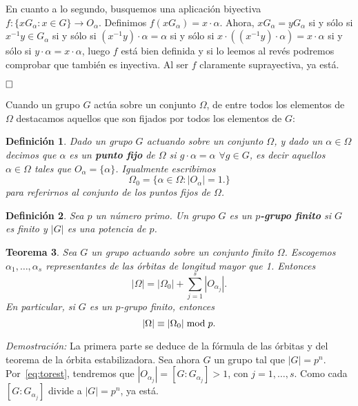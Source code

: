 \documentclass[12pt]{article}
\newtheorem{theorem}{Teorema}[section]
\newtheorem{definition}[theorem]{Definición}
\begin{document}
En cuanto a lo segundo, busquemos una aplicación biyectiva $f \colon \lbrace xG_\alpha : x \in G \rbrace \longrightarrow O_\alpha$. Definimos $f(xG_\alpha) = x\cdot \alpha$. Ahora, $xG_\alpha = y G_\alpha$ si y sólo si $x^{-1}y \in G_\alpha$ si y sólo si $(x^{-1}y) \cdot \alpha = \alpha$ si y sólo si $x \cdot ((x^{-1}y) \cdot \alpha) = x \cdot \alpha$ si y sólo si $y \cdot \alpha = x \cdot \alpha$, luego $f$ está bien definida y si lo leemos al revés podremos comprobar que también es inyectiva. Al ser $f$ claramente suprayectiva, ya está.

$\hfill \square$

Cuando un grupo $G$ actúa sobre un conjunto $\Omega$, de entre todos los elementos de $\Omega$ destacamos aquellos que son fijados por todos los elementos de $G$:

\begin{definition}Dado un grupo $G$ actuando sobre un conjunto $\Omega$, y dado un $\alpha \in \Omega$ decimos que $\alpha$ es un \textbf{punto fijo} de $\Omega$ si $g \cdot \alpha = \alpha$ $\forall g \in G$, es decir aquellos $\alpha \in \Omega$ tales que $O_\alpha = \lbrace \alpha \rbrace$. Igualmente escribimos $$\Omega_0 = \lbrace \alpha \in \Omega : |O_\alpha | = 1. \rbrace$$ para referirnos al conjunto de los puntos fijos de $\Omega$.
\end{definition}

\begin{definition}Sea $p$ un número primo. Un grupo $G$ es un \textbf{$p$-grupo finito} si $G$ es finito y $|G|$ es una potencia de $p$.
\end{definition}

\begin{theorem}\label{eq:ecClasesp}
Sea $G$ un grupo actuando sobre un conjunto finito $\Omega$. Escogemos $\alpha_1, \ldots, \alpha_s$ representantes de las órbitas de longitud mayor que 1. Entonces $$|\Omega| = |\Omega_0| + \sum_{j=1}^s |O_{\alpha_j}|.$$ En particular, si $G$ es un $p$-grupo finito, entonces $$|\Omega| \equiv |\Omega_0|\hspace{0.1cm} \text{mod}\hspace{0.1cm} p.$$
\end{theorem}
\emph{Demostración: }La primera parte se deduce de la fórmula de las órbitas y del teorema de la órbita estabilizadora. Sea ahora $G$ un grupo tal que $|G| = p^n$. Por~\ref{eq:torest}, tendremos que $|O_{\alpha_j}| = [G:G_{\alpha_j}] > 1$, con $j = 1, \ldots , s$. Como cada $[G:G_{\alpha_j}]$ divide a $|G| = p^n$, ya está.
\end{document}
